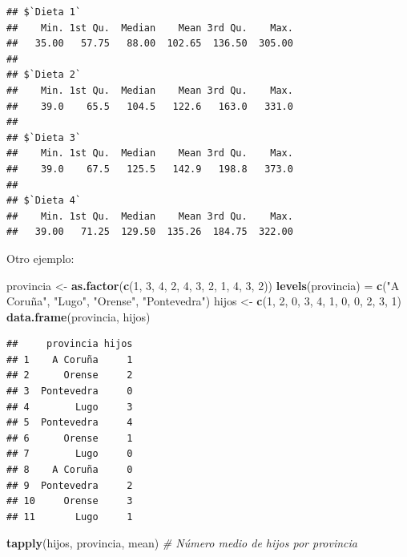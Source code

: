 \documentclass[]{book}
\newenvironment{Shaded}{\begin{snugshade}}{\end{snugshade}}
\newcommand{\CommentTok}[1]{\textcolor[rgb]{0.56,0.35,0.01}{\textit{#1}}}
\newcommand{\DecValTok}[1]{\textcolor[rgb]{0.00,0.00,0.81}{#1}}
\newcommand{\KeywordTok}[1]{\textcolor[rgb]{0.13,0.29,0.53}{\textbf{#1}}}
\newcommand{\NormalTok}[1]{#1}
\newcommand{\StringTok}[1]{\textcolor[rgb]{0.31,0.60,0.02}{#1}}
\begin{document}
\begin{verbatim}
## $`Dieta 1`
##    Min. 1st Qu.  Median    Mean 3rd Qu.    Max. 
##   35.00   57.75   88.00  102.65  136.50  305.00 
## 
## $`Dieta 2`
##    Min. 1st Qu.  Median    Mean 3rd Qu.    Max. 
##    39.0    65.5   104.5   122.6   163.0   331.0 
## 
## $`Dieta 3`
##    Min. 1st Qu.  Median    Mean 3rd Qu.    Max. 
##    39.0    67.5   125.5   142.9   198.8   373.0 
## 
## $`Dieta 4`
##    Min. 1st Qu.  Median    Mean 3rd Qu.    Max. 
##   39.00   71.25  129.50  135.26  184.75  322.00
\end{verbatim}

Otro ejemplo:

\begin{Shaded}
\begin{Highlighting}[]
\NormalTok{provincia <-}\StringTok{ }\KeywordTok{as.factor}\NormalTok{(}\KeywordTok{c}\NormalTok{(}\DecValTok{1}\NormalTok{, }\DecValTok{3}\NormalTok{, }\DecValTok{4}\NormalTok{, }\DecValTok{2}\NormalTok{, }\DecValTok{4}\NormalTok{, }\DecValTok{3}\NormalTok{, }\DecValTok{2}\NormalTok{, }\DecValTok{1}\NormalTok{, }\DecValTok{4}\NormalTok{, }\DecValTok{3}\NormalTok{, }\DecValTok{2}\NormalTok{))}
\KeywordTok{levels}\NormalTok{(provincia) =}\StringTok{ }\KeywordTok{c}\NormalTok{(}\StringTok{"A Coruña"}\NormalTok{, }\StringTok{"Lugo"}\NormalTok{, }\StringTok{"Orense"}\NormalTok{, }\StringTok{"Pontevedra"}\NormalTok{)}
\NormalTok{hijos <-}\StringTok{ }\KeywordTok{c}\NormalTok{(}\DecValTok{1}\NormalTok{, }\DecValTok{2}\NormalTok{, }\DecValTok{0}\NormalTok{, }\DecValTok{3}\NormalTok{, }\DecValTok{4}\NormalTok{, }\DecValTok{1}\NormalTok{, }\DecValTok{0}\NormalTok{, }\DecValTok{0}\NormalTok{, }\DecValTok{2}\NormalTok{, }\DecValTok{3}\NormalTok{, }\DecValTok{1}\NormalTok{)}
\KeywordTok{data.frame}\NormalTok{(provincia, hijos)}
\end{Highlighting}
\end{Shaded}

\begin{verbatim}
##     provincia hijos
## 1    A Coruña     1
## 2      Orense     2
## 3  Pontevedra     0
## 4        Lugo     3
## 5  Pontevedra     4
## 6      Orense     1
## 7        Lugo     0
## 8    A Coruña     0
## 9  Pontevedra     2
## 10     Orense     3
## 11       Lugo     1
\end{verbatim}

\begin{Shaded}
\begin{Highlighting}[]
\KeywordTok{tapply}\NormalTok{(hijos, provincia, mean) }\CommentTok{# Número medio de hijos por provincia}
\end{Highlighting}
\end{Shaded}
\end{document}
